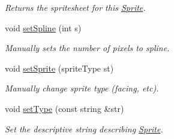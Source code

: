 \begin{DoxyCompactItemize}
\begin{DoxyCompactList}\small\item\em Returns the spritesheet for this \hyperlink{class_sprite}{Sprite}. \end{DoxyCompactList}\item 
void \hyperlink{class_sprite_a1ce4def2f83442fd086e38568f93c6cd}{set\+Spline} (int s)\hypertarget{class_sprite_a1ce4def2f83442fd086e38568f93c6cd}{}\label{class_sprite_a1ce4def2f83442fd086e38568f93c6cd}

\begin{DoxyCompactList}\small\item\em Manually sets the number of pixels to spline. \end{DoxyCompactList}\item 
void \hyperlink{class_sprite_aa9d0dd6123988d79c94a18f3e404d8d7}{set\+Sprite} (sprite\+Type st)\hypertarget{class_sprite_aa9d0dd6123988d79c94a18f3e404d8d7}{}\label{class_sprite_aa9d0dd6123988d79c94a18f3e404d8d7}

\begin{DoxyCompactList}\small\item\em Manually change sprite type (facing, etc). \end{DoxyCompactList}\item 
void \hyperlink{class_sprite_a0c2efc62131a56a1c81405527a930b71}{set\+Type} (const string \&str)\hypertarget{class_sprite_a0c2efc62131a56a1c81405527a930b71}{}\label{class_sprite_a0c2efc62131a56a1c81405527a930b71}

\begin{DoxyCompactList}\small\item\em Set the descriptive string describing \hyperlink{class_sprite}{Sprite}. \end{DoxyCompactList}\end{DoxyCompactItemize}
